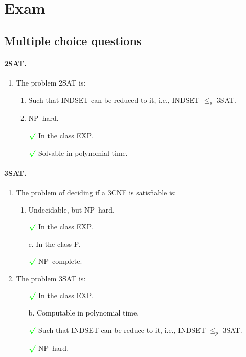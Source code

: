 \documentclass{article}
\begin{document}
	\section{Exam}
		\subsection{Multiple choice questions}
			\paragraph{2SAT.}
			\begin{enumerate}[label=\textbf{\arabic*.}, leftmargin=*]
				\item The problem 2SAT is:
				\begin{enumerate}[label=\alph*.]
					\item Such that INDSET can be reduced to it, i.e., INDSET $\leq_p$ 3SAT.
					\item NP--hard.
					\item[$\color{green}\boldsymbol{\surd}$] In the class EXP.
					\item[$\color{green}\boldsymbol{\surd}$] Solvable in polynomial time.
				\end{enumerate}
			\end{enumerate}
			\paragraph{3SAT.}
			\begin{enumerate}[label=\textbf{\arabic*.}, leftmargin=*]
				\item The problem of deciding if a 3CNF is satisfiable is:
				\begin{enumerate}[label=\alph*.]
					\item Undecidable, but NP--hard.
					\item[$\color{green}\boldsymbol{\surd}$] In the class EXP.
					\item[c.] In the class P.
					\item[$\color{green}\boldsymbol{\surd}$] NP--complete.
				\end{enumerate}
				\item The problem 3SAT is:
				\begin{enumerate}[label=\alph*.]
					\item[$\color{green}\boldsymbol{\surd}$] In the class EXP.
					\item[b.] Computable in polynomial time.
					\item[$\color{green}\boldsymbol{\surd}$] Such that INDSET can be reduce to it, i.e., INDSET $\leq_p$ 3SAT.
					\item[$\color{green}\boldsymbol{\surd}$] NP--hard.
				\end{enumerate}
			\end{enumerate}
\end{document}
